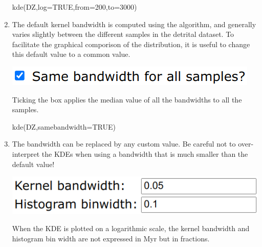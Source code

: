 \begin{refsection}
\begin{enumerate}
\begin{console}
kde(DZ,log=TRUE,from=200,to=3000)
\end{console}

\item The default kernel bandwidth is computed using the
  \citet{botev2010} algorithm, and generally varies slightly between
  the different samples in the detrital dataset. To facilitate the
  graphical comporison of the distribution, it is useful to change
  this default value to a common value.

\noindent\begin{minipage}[t]{.35\linewidth}
\strut\vspace*{-\baselineskip}\newline
\includegraphics[width=\linewidth]{../figures/detritalKDEsamebandwidth.png}
\end{minipage}
\begin{minipage}[t]{.65\linewidth}
  Ticking the box applies the median value of all the
  \citet{botev2010} bandwidths to all the samples.
\end{minipage}

\begin{console}
kde(DZ,samebandwidth=TRUE)
\end{console}

\item The \citet{botev2010} bandwidth can be replaced by any custom
  value.  Be careful not to over-interpret the KDEs when using a
  bandwidth that is much smaller than the default value!

\noindent\begin{minipage}[t]{.4\linewidth}
  \strut\vspace*{-\baselineskip}\newline
  \includegraphics[width=\linewidth]{../figures/detritalKDEcustombandwidth.png}
\end{minipage}
\begin{minipage}[t]{.6\linewidth}
  When the KDE is plotted on a logarithmic scale, the kernel bandwidth
  and histogram bin width are not expressed in Myr but in fractions.
\end{minipage}


\end{enumerate}
\end{refsection}
